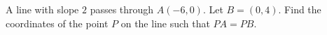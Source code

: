 A line with slope $2$ passes through $A(-6,0)$. Let $B=(0,4)$. Find the coordinates of the point $P$ on the line such that $PA=PB$.
